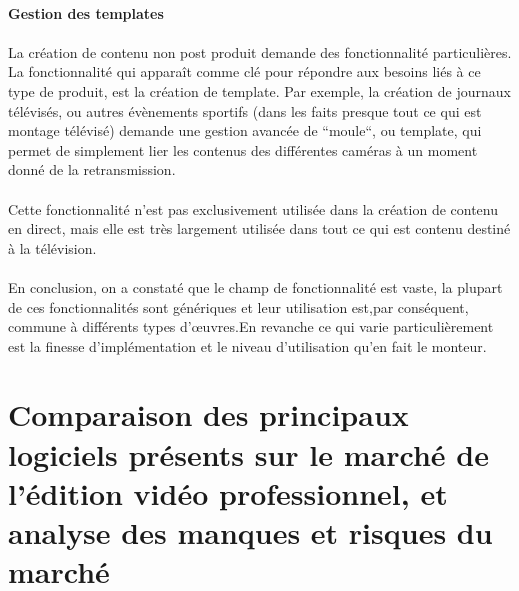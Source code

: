 \paragraph{Gestion des templates}

\paragraph{ }

La création de contenu non post produit demande des fonctionnalité particulières. La fonctionnalité
qui apparaît comme clé pour répondre aux besoins liés à ce type de produit, est la
création de template. Par exemple, la création de journaux télévisés, ou autres évènements
sportifs (dans les faits presque tout ce qui est montage télévisé) demande une gestion avancée de ``moule``,
ou template, qui permet de simplement lier les contenus des différentes caméras
à un moment donné de la retransmission.

\paragraph{ }

Cette fonctionnalité n'est pas exclusivement utilisée dans la création de contenu en direct, mais
elle est très largement utilisée dans tout ce qui est contenu destiné à la télévision.

\paragraph{}
\paragraph{}

En conclusion, on a constaté que le champ de fonctionnalité est vaste, la plupart de ces
fonctionnalités sont génériques et leur
utilisation est,par conséquent, commune à différents types d'œuvres.En revanche ce qui varie particulièrement  est
la finesse d'implémentation et le niveau d'utilisation qu'en fait le monteur.

\newpage
\section{Comparaison des principaux logiciels présents sur le marché de
  l'édition vidéo professionnel, et analyse des manques et risques du marché}

\paragraph{}

